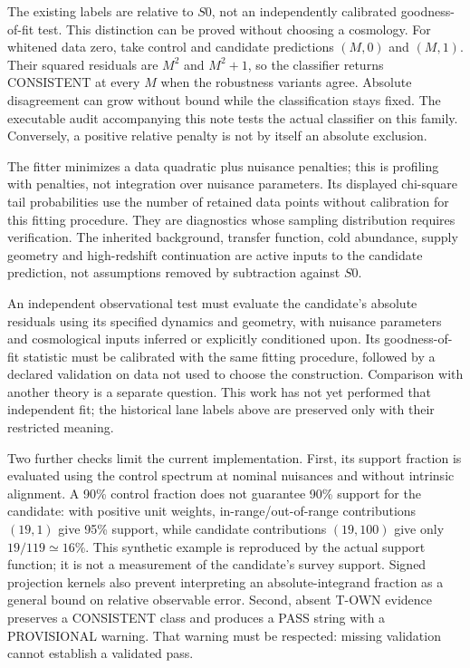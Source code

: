 \documentclass[11pt]{article}
\begin{document}
The existing labels are relative to $S0$, not an independently calibrated goodness-of-fit test. This distinction can be proved without choosing a cosmology. For whitened data zero, take control and candidate predictions $(M,0)$ and $(M,1)$. Their squared residuals are $M^2$ and $M^2+1$, so the classifier returns CONSISTENT at every $M$ when the robustness variants agree. Absolute disagreement can grow without bound while the classification stays fixed. The executable audit accompanying this note tests the actual classifier on this family. Conversely, a positive relative penalty is not by itself an absolute exclusion.

The fitter minimizes a data quadratic plus nuisance penalties; this is profiling with penalties, not integration over nuisance parameters. Its displayed chi-square tail probabilities use the number of retained data points without calibration for this fitting procedure. They are diagnostics whose sampling distribution requires verification. The inherited background, transfer function, cold abundance, supply geometry and high-redshift continuation are active inputs to the candidate prediction, not assumptions removed by subtraction against $S0$.

An independent observational test must evaluate the candidate's absolute residuals using its specified dynamics and geometry, with nuisance parameters and cosmological inputs inferred or explicitly conditioned upon. Its goodness-of-fit statistic must be calibrated with the same fitting procedure, followed by a declared validation on data not used to choose the construction. Comparison with another theory is a separate question. This work has not yet performed that independent fit; the historical lane labels above are preserved only with their restricted meaning.

Two further checks limit the current implementation. First, its support fraction is evaluated using the control spectrum at nominal nuisances and without intrinsic alignment. A 90\% control fraction does not guarantee 90\% support for the candidate: with positive unit weights, in-range/out-of-range contributions $(19,1)$ give 95\% support, while candidate contributions $(19,100)$ give only $19/119\simeq16$\%. This synthetic example is reproduced by the actual support function; it is not a measurement of the candidate's survey support. Signed projection kernels also prevent interpreting an absolute-integrand fraction as a general bound on relative observable error. Second, absent T-OWN evidence preserves a CONSISTENT class and produces a PASS string with a PROVISIONAL warning. That warning must be respected: missing validation cannot establish a validated pass.
\end{document}
